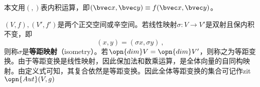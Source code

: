 本文用$(,)$表内积运算，即$(\bvec x,\bvec y)\equiv f(\bvec x,\bvec y) $。
\begin{definition}{}
$(V,f),(V',f')$是两个正交空间或辛空间。若线性映射$\sigma:V\rightarrow V'$是双射且保内积不变，即\begin{equation}
(x,y)=(\sigma x,\sigma y)~,
\end{equation}
则称$\sigma $是\textbf{等距映射}（isometry）。若$\opn{dim}V=\opn{dim}V'$，则称之为等距变换。由于等距变换是线性映射，因此保加法和数乘运算，是全体向量的自同构映射。由定义式可知，其复合依然是等距变换。因此全体等距变换的集合可记作zit$\opn{Aut}(V,g)$
\end{definition}

